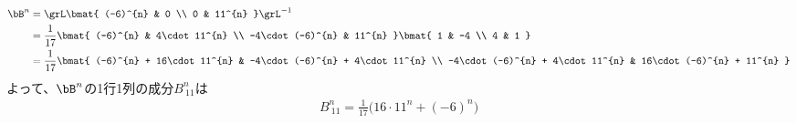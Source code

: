 \begin{ans*}
\begin{enumerate}[label=(\arabic*), ref=(\arabic*), itemsep=0pt]
\begin{other*}
      \begin{align}
        \bB^{n}
        &= \grL \bmat{
          (-6)^{n} & 0 \\ 0 & 11^{n}
        }\grL^{-1} \\
        &= \frac{1}{17}\bmat{
          (-6)^{n} & 4\cdot 11^{n} \\
          -4\cdot(-6)^{n} & 11^{n}
        }\bmat{
          1 & -4 \\ 4 & 1
        } \\
        &= \frac{1}{17} \bmat{
          (-6)^{n} + 16\cdot 11^{n} &
          -4\cdot(-6)^{n} + 4\cdot 11^{n} \\
          -4\cdot(-6)^{n} + 4\cdot 11^{n} &
          16\cdot(-6)^{n} + 11^{n}
        }
      \end{align}
      よって、$\bB^{n}$の1行1列の成分$B^{n}_{\:11}$は
      \begin{gather}
        B^{n}_{\:11}
        = \frac{1}{17}\bigl(16\cdot 11^{n} + (-6)^{n}\bigr)
      \end{gather}
    \end{other*}
  \end{enumerate}
\end{ans*}
